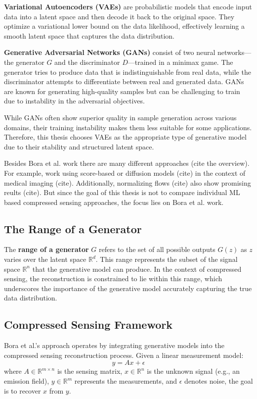 \textbf{Variational Autoencoders (VAEs)} are probabilistic models that encode input data into a latent space and then decode it back to the original space.
They optimize a variational lower bound on the data likelihood, effectively learning a smooth latent space that captures the data distribution.

\textbf{Generative Adversarial Networks (GANs)} consist of two neural networks—the generator $G$ and the discriminator $D$—trained in a minimax game.
The generator tries to produce data that is indistinguishable from real data, while the discriminator attempts to differentiate between real and generated data.
GANs are known for generating high-quality samples but can be challenging to train due to instability in the adversarial objectives.

While GANs often show superior quality in sample generation across various domains, their training instability makes them less suitable for some applications.
Therefore, this thesis chooses VAEs as the appropriate type of generative model due to their stability and structured latent space.

Besides Bora et al. work there are many different approaches (cite the overview).
For example, work using score-based or diffusion models (cite) in the context of medical imaging (cite).
Additionally, normalizing flows (cite) also show promising reults (cite).
But since the goal of this thesis is not to compare individual ML based compressed sensing approaches, the focus lies on Bora et al. work.

\subsection{The Range of a Generator}

The \textbf{range of a generator} $G$ refers to the set of all possible outputs $G(z)$ as $z$ varies over the latent space $\mathbb{R}^d$.
This range represents the subset of the signal space $\mathbb{R}^n$ that the generative model can produce.
In the context of compressed sensing, the reconstruction is constrained to lie within this range, which underscores the importance of the generative model accurately capturing the true data distribution.

\subsection{Compressed Sensing Framework}

Bora et al.'s approach operates by integrating generative models into the compressed sensing reconstruction process.
Given a linear measurement model:
\begin{equation}
    y = A x + \epsilon
\end{equation}
where $A \in \mathbb{R}^{m \times n}$ is the sensing matrix, $x \in \mathbb{R}^n$ is the unknown signal (e.g., an emission field), $y \in \mathbb{R}^m$ represents the measurements, and $\epsilon$ denotes noise, the goal is to recover $x$ from $y$.

